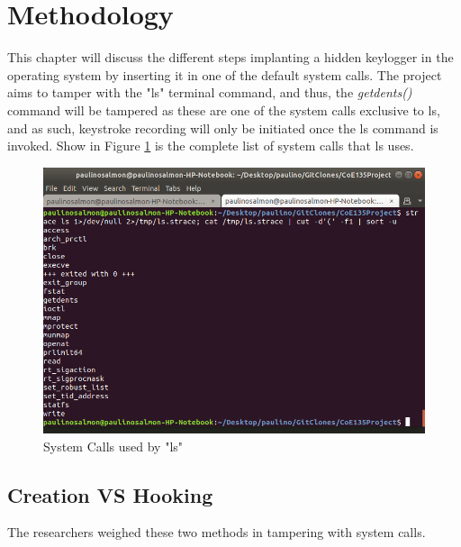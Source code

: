 \documentclass[conference]{IEEEtran}
\begin{document}
	\section{Methodology}
	This chapter will discuss the different steps implanting a hidden keylogger in the operating system by inserting it in one of the default system calls. The project aims to tamper with the "ls" terminal command, and thus, the \emph{getdents()} command will be tampered as these are one of the system calls exclusive to ls, and as such, keystroke recording will only be initiated once the ls command is invoked. Show in Figure \ref{fig:getdents-strace} is the complete list of system calls that ls uses.
	
	\begin{figure}[H]
		\begin{centering}
			\includegraphics[width=0.7\columnwidth]{images/getdents.png}
			\par\end{centering}
		\caption{System Calls used by "ls"\label{fig:getdents-strace}}
	\end{figure}
	
\subsection{Creation VS Hooking}
	The researchers weighed these two methods in tampering with system calls. 
\end{document}
